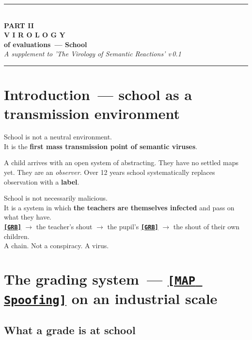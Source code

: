 \documentclass[13pt,a4paper]{article}
\newcommand{\termr}[1]{%
  \hyperref[glossary:#1]{\textbf{\texttt{\textcolor{sce-blue}{[#1]}}}}%
}
\newcommand{\kav}[1]{\textcolor{sce-red}{'#1'}}
\newenvironment{warnbox}[1]{%
  \vspace{0.9em}
  \begin{mdframed}[
    linecolor=sce-red, linewidth=4pt,
    topline=false, rightline=false, bottomline=false,
    backgroundcolor=bg-red,
    innerleftmargin=12pt, innerrightmargin=10pt,
    innertopmargin=8pt, innerbottommargin=8pt,
    skipabove=0pt, skipbelow=0pt
  ]
  \noindent{\montserrat\normalsize\bfseries\color{sce-red}#1}\par\vspace{4pt}%
  \ignorespaces
}{%
  \end{mdframed}
  \vspace{0.6em}
}
\begin{document}
\newpage
\begin{center}
\vspace*{1cm}
\textcolor{sce-gold}{\rule{0.5\textwidth}{0.4pt}}\\[0.8em]
{\montserrat\Large\bfseries{}\color{sce-black}
PART II}\\[0.4em]
{\montserrat\large\bfseries{}\color{sce-grey}
V I R O L O G Y}\\[0.2em]
{\montserrat\normalsize\bfseries{}\color{sce-grey}
of evaluations~--- School}\\[0.4em]
{\small\itshape\color{sce-grey}
A supplement to \kav{The Virology of Semantic Reactions} v\,0.1}\\[0.8em]
\textcolor{sce-gold}{\rule{0.5\textwidth}{0.4pt}}
\vspace{1cm}
\end{center}

\section{Introduction~--- school as a transmission environment}

School is not a neutral environment.\\
It is the \textbf{first mass transmission point of semantic viruses}.

A child arrives with an open system of abstracting. They have no settled maps yet. They are
an \textit{observer}. Over 12 years school systematically replaces observation with a
\textbf{label}.

\begin{warnbox}{Key observation}
School is not necessarily malicious.\\
It is a system in which \textbf{the teachers are themselves infected} and pass on what they
have.\\[0.3em]
\termr{GRB} $\to$ the teacher's shout $\to$ the pupil's \termr{GRB} $\to$ the shout of their
own children.\\[0.3em]
A chain. Not a conspiracy. A virus.
\end{warnbox}

\section{The grading system~--- \termr{MAP Spoofing} on an industrial scale}

\subsection{What a grade is at school}
\end{document}
